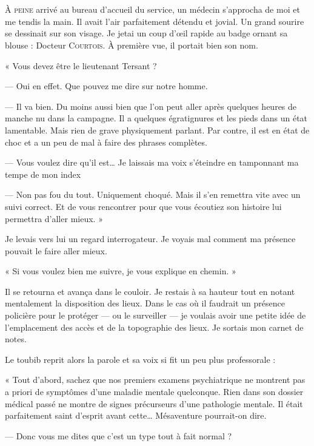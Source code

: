 \chapter{}

\lettrine[lines=1]{À}{ peine} arrivé au bureau d'accueil du service, un médecin s'approcha de moi et me tendis la main.
Il avait l'air parfaitement détendu et jovial. Un grand sourire se dessinait sur son visage. Je jetai un coup d'œil
rapide au badge ornant sa blouse : Docteur \textsc{Courtois}. À première vue, il portait bien son nom.

« Vous devez être le lieutenant Tersant ?

— Oui en effet. Que pouvez me dire sur notre homme.

— Il va bien. Du moins aussi bien que l'on peut aller après quelques heures de manche nu dans la campagne. Il a
quelques égratignures et les pieds dans un état lamentable. Mais rien de grave physiquement parlant. Par contre, il est
en état de choc et a un peu de mal à faire des phrases complètes.

— Vous voulez dire qu'il est… Je laissais ma voix s'éteindre en tamponnant ma tempe de mon index

— Non pas fou du tout. Uniquement choqué. Mais il s'en remettra vite avec un suivi correct. Et de vous rencontrer pour
que vous écoutiez son histoire lui permettra d'aller mieux. »

Je levais vers lui un regard interrogateur. Je voyais mal comment ma présence pouvait le faire aller mieux.

« Si vous voulez bien me suivre, je vous explique en chemin. »

Il se retourna et avança dans le couloir. Je restais à sa hauteur tout en notant mentalement la disposition des lieux.
Dans le cas où il faudrait un présence policière pour le protéger — ou le surveiller — je voulais avoir une petite idée
de l'emplacement des accès et de la topographie des lieux. Je sortais mon carnet de notes.

Le toubib reprit alors la parole et sa voix si fit un peu plus professorale :

« Tout d'abord, sachez que nos premiers examens psychiatrique ne montrent pas a priori de symptômes d'une maladie
mentale quelconque. Rien dans son dossier médical passé ne montre de signes précurseurs d'une pathologie mentale. Il
était parfaitement saint d'esprit avant cette… Mésaventure pourrait-on dire.

— Donc vous me dites que c'est un type tout à fait normal ?

